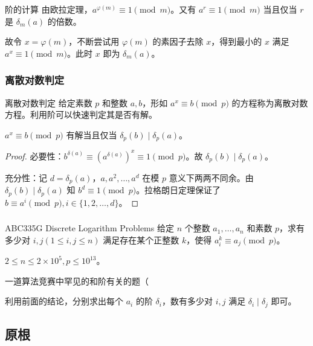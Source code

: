 \documentclass[../main.tex]{subfiles}
\begin{document}
\begin{frame}{阶的计算}
由欧拉定理，$a^{\varphi(m)}\equiv1\pmod m$。又有 $a^r\equiv 1\pmod m$ 当且仅当 $r$ 是 $\delta_m(a)$ 的倍数。\pause

故令 $x=\varphi(m)$，不断尝试用 $\varphi(m)$ 的素因子去除 $x$，得到最小的 $x$ 满足 $a^x\equiv 1\pmod m$。此时 $x$ 即为 $\delta_m(a)$。
\end{frame}

\subsubsection{离散对数判定}

\begin{frame}{离散对数判定}
给定素数 $p$ 和整数 $a,b$，形如 $a^x\equiv b\pmod p$ 的方程称为离散对数方程。利用阶可以快速判定其是否有解。\pause

\begin{theo}
$a^x\equiv b\pmod p$ 有解当且仅当 $\delta_p(b)\mid \delta_p(a)$。
\end{theo}\pause

\begin{proof}
必要性：$b^{\delta(a)}\equiv (a^{\delta(a)})^x\equiv 1\pmod p$。故 $\delta_p(b)\mid\delta_p(a)$。\pause

充分性：记 $d=\delta_p(a)$，$a,a^2,\dots,a^d$ 在模 $p$ 意义下两两不同余。由 $\delta_p(b)\mid\delta_p(a)$ 知 $b^d\equiv 1\pmod p$。拉格朗日定理保证了 $b\equiv a^i\pmod p,i\in\{1,2,\dots,d\}$。
\end{proof}
\end{frame}

\subsubsection{}

\begin{frame}{ABC335G Discrete Logarithm Problems}
给定 $n$ 个整数 $a_1,\dots,a_n$ 和素数 $p$，求有多少对 $i,j(1\le i,j\le n)$ 满足存在某个正整数 $k$，使得 $a_i^k\equiv a_j\pmod p$。

$2\le n\le 2\times10^5,p\le 10^{13}$。\pause
\bigskip
    
一道算法竞赛中罕见的和阶有关的题（\pause

利用前面的结论，分别求出每个 $a_i$ 的阶 $\delta_i$，数有多少对 $i,j$ 满足 $\delta_i\mid\delta_j$ 即可。
\end{frame}

\subsection{原根}
\end{document}
